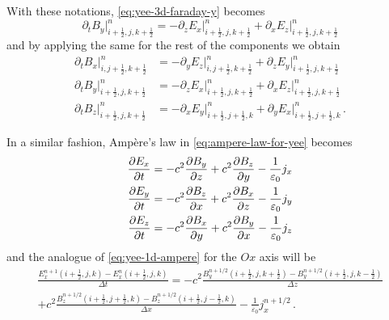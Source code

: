 \documentclass[12pt, class=report, crop=false]{standalone}
\begin{document}
With these notations, \cref{eq:yee-3d-faraday-y} becomes
\[
\partial_t B_y \rvert^n_{i+\frac{1}{2},j,k+\frac{1}{2}} =
  -\partial_z E_x \rvert^n_{i+\frac{1}{2},j,k+\frac{1}{2}}
  +\partial_x E_z \rvert^n_{i+\frac{1}{2},j,k+\frac{1}{2}}
\]
and by applying the same for the rest of the components we obtain
\begin{align*}
  \partial_t B_x \rvert^n_{i,j+\frac{1}{2},k+\frac{1}{2}} &=
  -\partial_y E_z \rvert^n_{i,j+\frac{1}{2},k+\frac{1}{2}}
  +\partial_z E_y \rvert^n_{i+\frac{1}{2},j,k+\frac{1}{2}} \\
  \partial_t B_y \rvert^n_{i+\frac{1}{2},j,k+\frac{1}{2}} &=
  -\partial_z E_x \rvert^n_{i+\frac{1}{2},j,k+\frac{1}{2}}
  +\partial_x E_z \rvert^n_{i+\frac{1}{2},j,k+\frac{1}{2}} \\
  \partial_t B_z \rvert^n_{i+\frac{1}{2},j,k+\frac{1}{2}} &=
  -\partial_x E_y \rvert^n_{i+\frac{1}{2},j+\frac{1}{2},k}
  +\partial_y E_x \rvert^n_{i+\frac{1}{2},j+\frac{1}{2},k} \,.
\end{align*}

In a similar fashion, Ampère's law in \cref{eq:ampere-law-for-yee} becomes
\begin{align*}
  \pdv{E_x}{t} &= -c^2 \pdv{B_y}{z} + c^2 \pdv{B_z}{y} - \frac{1}{\varepsilon_0} j_x \\
  \pdv{E_y}{t} &= -c^2 \pdv{B_z}{x} + c^2 \pdv{B_x}{z} - \frac{1}{\varepsilon_0} j_y \\
  \pdv{E_z}{t} &= -c^2 \pdv{B_x}{y} + c^2 \pdv{B_y}{x} - \frac{1}{\varepsilon_0} j_z
\end{align*}
and the analogue of \cref{eq:yee-1d-ampere} for the \(Ox\) axis will be
\begin{equation}
  \label{eq:yee-3d-ampere-y}
  \begin{aligned}
    \frac{E_x^{n+1}(i+\frac{1}{2},j,k)- E_x^n(i+\frac{1}{2},j,k)}{\Delta t} =
    -c^2\frac{B_y^{n+1/2}(i+\frac{1}{2},j,k+\frac{1}{2}) -
      B_y^{n+1/2}(i+\frac{1}{2},j,k-\frac{1}{2})}{\Delta z} \\
    + c^2\frac{B_z^{n+1/2}(i+\frac{1}{2},j+\frac{1}{2},k) -
      B_z^{n+1/2}(i+\frac{1}{2},j-\frac{1}{2},k)}{\Delta x}
    - \frac{1}{\varepsilon_0}j_x^{n+1/2}\,.
  \end{aligned}
\end{equation}
\end{document}
